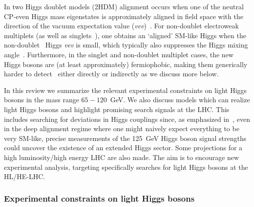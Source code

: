 \documentclass[../report.tex]{subfiles}
\begin{document}
In two Higgs doublet models (2HDM) alignment occurs when one of the
neutral CP-even Higgs mass eigenstates is approximately aligned in field
space with the direction of the vacuum expectation value
(\emph{vev})~\cite{Carena:2013ooa,Bernon:2015wef}. For non-doublet
electroweak multiplets (as well as singlets~\cite{Robens:2015gla}), one
obtains an `aligned' SM-like Higgs when the
non-doublet~\cite{Georgi:1985nv,Killick:2013mya} Higgs \emph{vev} is
small, which typically also suppresses the Higgs mixing
angle~\cite{Haber:1978jt,Hartling:2014zca}. Furthermore, in the singlet
and non-doublet multiplet cases, the new Higgs bosons are (at least
approximately) fermiophobic, making them generically harder to
detect~\cite{Akeroyd:1998ui,Akeroyd:1995hg,Delgado:2016arn,Vega:2018ddp}
either directly or indirectly as we discuss more below.  

In this review we summarize the relevant experimental constraints on
light Higgs bosons in the mass range $65 - 120$~GeV. We also discuss
models which can realize light Higgs bosons and highlight promising
search signals at the LHC. This includes searching for deviations in
Higgs couplings since, as emphasized in~\cite{Bernon:2015wef}, even in
the deep alignment regime where one might naively expect everything to
be very SM-like, precise measurements of the 125~GeV Higgs boson signal
strengths could uncover the existence of an extended Higgs sector. Some
projections for a high luminosity/high energy LHC are also made. 
The aim is to encourage new experimental analysis, targeting
specifically searches for light Higgs bosons at the HL/HE-LHC.

\subsubsection{Experimental constraints on light Higgs bosons}\label{sec:limits}
\end{document}
